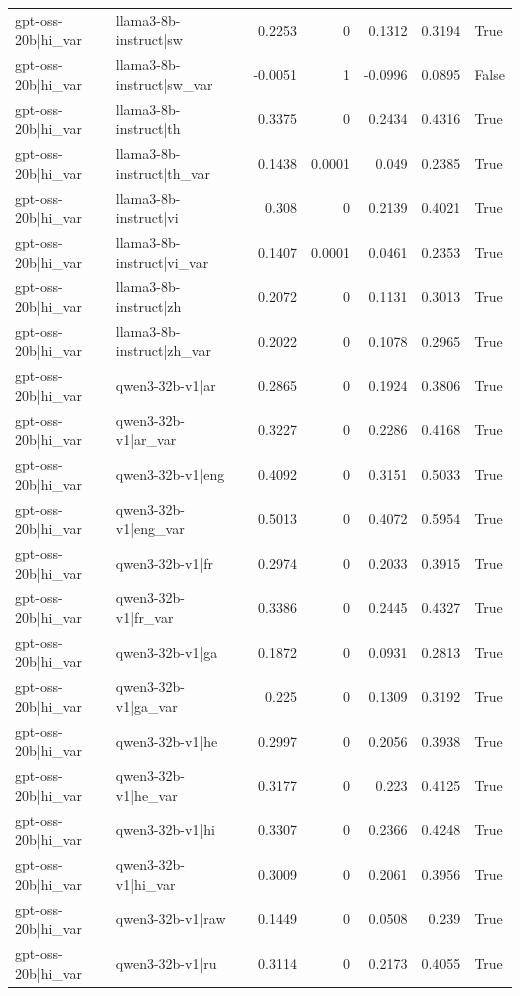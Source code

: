 \begin{table}
\begin{tabular}{l l r r r r l}
gpt-oss-20b|hi_var & llama3-8b-instruct|sw & 0.2253 & 0 & 0.1312 & 0.3194 & True \\
gpt-oss-20b|hi_var & llama3-8b-instruct|sw_var & -0.0051 & 1 & -0.0996 & 0.0895 & False \\
gpt-oss-20b|hi_var & llama3-8b-instruct|th & 0.3375 & 0 & 0.2434 & 0.4316 & True \\
gpt-oss-20b|hi_var & llama3-8b-instruct|th_var & 0.1438 & 0.0001 & 0.049 & 0.2385 & True \\
gpt-oss-20b|hi_var & llama3-8b-instruct|vi & 0.308 & 0 & 0.2139 & 0.4021 & True \\
gpt-oss-20b|hi_var & llama3-8b-instruct|vi_var & 0.1407 & 0.0001 & 0.0461 & 0.2353 & True \\
gpt-oss-20b|hi_var & llama3-8b-instruct|zh & 0.2072 & 0 & 0.1131 & 0.3013 & True \\
gpt-oss-20b|hi_var & llama3-8b-instruct|zh_var & 0.2022 & 0 & 0.1078 & 0.2965 & True \\
gpt-oss-20b|hi_var & qwen3-32b-v1|ar & 0.2865 & 0 & 0.1924 & 0.3806 & True \\
gpt-oss-20b|hi_var & qwen3-32b-v1|ar_var & 0.3227 & 0 & 0.2286 & 0.4168 & True \\
gpt-oss-20b|hi_var & qwen3-32b-v1|eng & 0.4092 & 0 & 0.3151 & 0.5033 & True \\
gpt-oss-20b|hi_var & qwen3-32b-v1|eng_var & 0.5013 & 0 & 0.4072 & 0.5954 & True \\
gpt-oss-20b|hi_var & qwen3-32b-v1|fr & 0.2974 & 0 & 0.2033 & 0.3915 & True \\
gpt-oss-20b|hi_var & qwen3-32b-v1|fr_var & 0.3386 & 0 & 0.2445 & 0.4327 & True \\
gpt-oss-20b|hi_var & qwen3-32b-v1|ga & 0.1872 & 0 & 0.0931 & 0.2813 & True \\
gpt-oss-20b|hi_var & qwen3-32b-v1|ga_var & 0.225 & 0 & 0.1309 & 0.3192 & True \\
gpt-oss-20b|hi_var & qwen3-32b-v1|he & 0.2997 & 0 & 0.2056 & 0.3938 & True \\
gpt-oss-20b|hi_var & qwen3-32b-v1|he_var & 0.3177 & 0 & 0.223 & 0.4125 & True \\
gpt-oss-20b|hi_var & qwen3-32b-v1|hi & 0.3307 & 0 & 0.2366 & 0.4248 & True \\
gpt-oss-20b|hi_var & qwen3-32b-v1|hi_var & 0.3009 & 0 & 0.2061 & 0.3956 & True \\
gpt-oss-20b|hi_var & qwen3-32b-v1|raw & 0.1449 & 0 & 0.0508 & 0.239 & True \\
gpt-oss-20b|hi_var & qwen3-32b-v1|ru & 0.3114 & 0 & 0.2173 & 0.4055 & True \\

\end{tabular}
\end{table}
